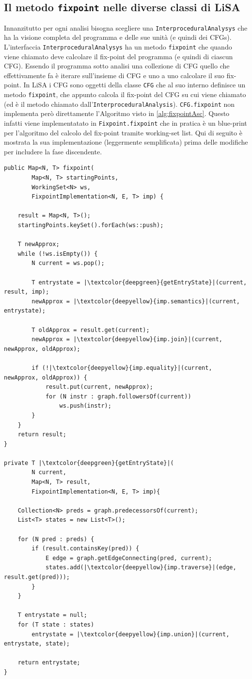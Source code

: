 \subsection{Il metodo \texttt{fixpoint} nelle diverse classi di LiSA}
Innanzitutto per ogni analisi bisogna scegliere una \texttt{InterproceduralAnalysys} che ha la visione completa del programma e delle sue unità (e quindi dei CFGs). L'interfaccia \texttt{InterproceduralAnalysys} ha un metodo \texttt{fixpoint} che quando viene chiamato deve calcolare il fix-point del programma (e quindi di ciascun CFG). Essendo il programma sotto analisi una collezione di CFG quello che effettivamente fa è iterare sull'insieme di CFG e uno a uno calcolare il suo fix-point. In LiSA i CFG sono oggetti della classe \texttt{CFG} che al suo interno definisce un metodo \texttt{fixpoint}, che appunto calcola il fix-point del CFG su cui viene chiamato (ed è il metodo chiamato dall'\texttt{InterproceduralAnalysis}). \texttt{CFG.fixpoint} non implementa però direttamente l'Algoritmo visto in \ref{alg:fixpointAsc}. Questo infatti viene implementatato in \texttt{Fixpoint.fixpoint} che in pratica è un blue-print per l'algoritmo del calcolo del fix-point tramite working-set list. Qui di seguito è mostrata la sua implementazione (leggermente semplificata) prima delle modifiche per includere la fase discendente. 
\begin{lstlisting}[belowskip=-1.1 \baselineskip, escapechar=|]
public Map<N, T> fixpoint(
        Map<N, T> startingPoints,
        WorkingSet<N> ws,
        FixpointImplementation<N, E, T> imp) {

    result = Map<N, T>();
    startingPoints.keySet().forEach(ws::push);

    T newApprox;
    while (!ws.isEmpty()) {
        N current = ws.pop();

        T entrystate = |\textcolor{deepgreen}{getEntryState}|(current, result, imp);
        newApprox = |\textcolor{deepyellow}{imp.semantics}|(current, entrystate);

        T oldApprox = result.get(current);
        newApprox = |\textcolor{deepyellow}{imp.join}|(current, newApprox, oldApprox);

        if (!|\textcolor{deepyellow}{imp.equality}|(current, newApprox, oldApprox)) {
            result.put(current, newApprox);
            for (N instr : graph.followersOf(current))
                ws.push(instr);
        }
    }
    return result;
}

private T |\textcolor{deepgreen}{getEntryState}|(
        N current,
        Map<N, T> result,
        FixpointImplementation<N, E, T> imp){
    
    Collection<N> preds = graph.predecessorsOf(current);
    List<T> states = new List<T>();

    for (N pred : preds) {
        if (result.containsKey(pred)) {
            E edge = graph.getEdgeConnecting(pred, current);
            states.add(|\textcolor{deepyellow}{imp.traverse}|(edge, result.get(pred)));
        }
    }

    T entrystate = null;
    for (T state : states)
        entrystate = |\textcolor{deepyellow}{imp.union}|(current, entrystate, state);

    return entrystate;
}
\end{lstlisting}
